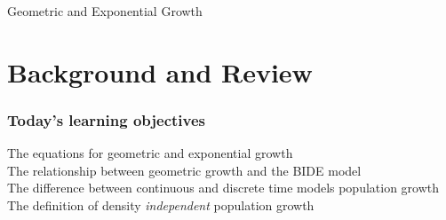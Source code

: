 \documentclass[color=usenames,dvipsnames]{beamer}\usepackage[]{graphicx}\usepackage[]{color}
\begin{document}


{
\begin{frame}[plain]
  \vspace{-4.2cm}
  \begin{center}
    {\huge Geometric and Exponential Growth } \\
  \end{center}
\end{frame}
}





\section{Background and Review}



\begin{frame}[plain]
  \frametitle{Today's learning objectives}
  \Large
  The equations for geometric and exponential growth \\
  \pause
  \vfill
  The relationship between geometric growth and the BIDE model \\
  \pause
  \vfill
  The difference between continuous and discrete time models
  population growth \\
  \pause
  \vfill
  The definition of density \textit{independent} population growth \\
\end{frame}
\end{document}
